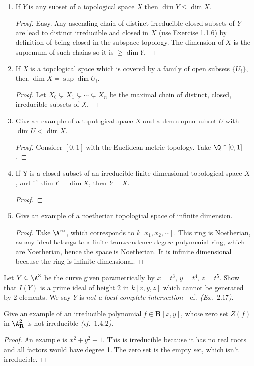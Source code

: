 \begin{exercise}%
~
\begin{enumerate}
\item If $Y$ is any subset of a topological space $X$ then $\dim Y \leq \dim X$. 
\begin{proof}
	Easy. Any ascending chain of distinct irreducible closed subsets of $Y $ are lead to distinct irreducible and closed in $X$ (use Exercise 1.1.6) by definition of being closed in the subspace topology.
	The dimension of $X $ is the supremum of such chains so it is $\ge \dim Y $.
\end{proof}
\item If $X$ is a topological space which is covered by a family of open subsets $\{U_{i}\}$, then $\dim X = \sup \dim U_i$.
\begin{proof}
	Let $X_{0}\subsetneq X_{1}\subsetneq \cdots \subsetneq X_n $ be the maximal chain of distinct, closed, irreducible subsets of $X $.
\end{proof}
\item Give an example of a topological space $X$ and a dense open subset $U$ with $\dim U < \dim X$. 
\begin{proof}
	Consider $[0,1] $ with the Euclidean metric topology.
	Take $\Q\cap [0,1] $.
\end{proof}
\item If Y is a closed subset of an irreducible finite-dimensional topological space $X$, and if $\dim Y = \dim X$, then $Y= X$. 
\begin{proof}
\end{proof}
\item Give an example of a noetherian topological space of infinite dimension.  
\begin{proof}
	Take $\A^\infty $, which corresponds to $k[x_{1},x_{2},\cdots] $.
	This ring is Noetherian, as any ideal belongs to a finite transcendence degree polynomial ring, which are Noetherian, hence the space is Noetherian.
	It is infinite dimensional because the ring is infinite dimensional.
\end{proof}
\end{enumerate}
\end{exercise}

\begin{exercise}%
Let $Y \subseteq \A^3$ be the curve given parametrically by $x = t^3$, $y= t^4$, $z = t^5$. Show that $I(Y)$ is a prime ideal of height $2$ in $k[x,y,z]$ which cannot be generated by $2$ elements. We say $Y$ is \emph{not a local complete intersection}---cf.~\emph{(Ex.~$2.17$)}. 
\end{exercise}

\begin{exercise}%
Give an example of an irreducible polynomial $f \in \mathbf{R}[x,y]$, whose zero set $Z(f)$ in $\A_{\mathbf{R}}^2$ is not irreducible
\emph{(cf.~$1.4.2$)}.
\end{exercise}
\begin{proof}
	An example is $x^2+y^2+1 $.
	This is irreducible because it has no real roots and all factors would have degree 1.
	The zero set is the empty set, which isn't irreducible.
\end{proof}
